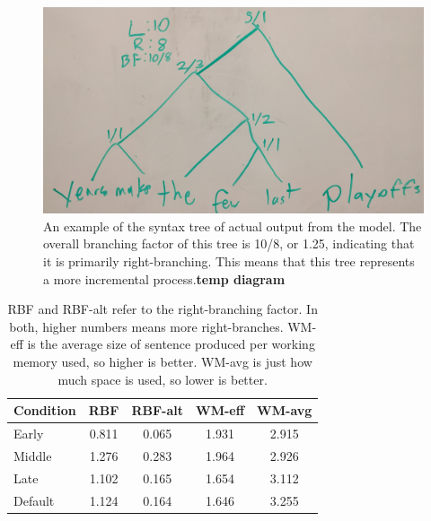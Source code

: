 \begin{figure}[ht]
\begin{center}
\includegraphics[width=0.95\columnwidth]{figures/tree}
\end{center}
\caption{An example of the syntax tree of actual output from the model. The overall branching factor of this tree is 10/8, or 1.25, indicating that it is primarily right-branching. This means that this tree represents a more incremental process.\textbf{temp diagram}}  
\label{tree}
\end{figure}

\begin{table}
\centering
\begin{tabular}{l|cccc}
Condition & RBF & RBF-alt & WM-eff & WM-avg \\ \hline
Early & 0.811 & 0.065 & 1.931 & 2.915 \\
Middle & 1.276 & 0.283 & 1.964 & 2.926 \\
Late & 1.102 & 0.165 & 1.654 & 3.112 \\
Default & 1.124 & 0.164 & 1.646 & 3.255 \\
\end{tabular}
\label{bfmem}
\caption{RBF and RBF-alt refer to the right-branching factor. In both, higher numbers means more right-branches. WM-eff is the average size of sentence produced per working memory used, so higher is better. WM-avg is just how much space is used, so lower is better.}
\end{table}

